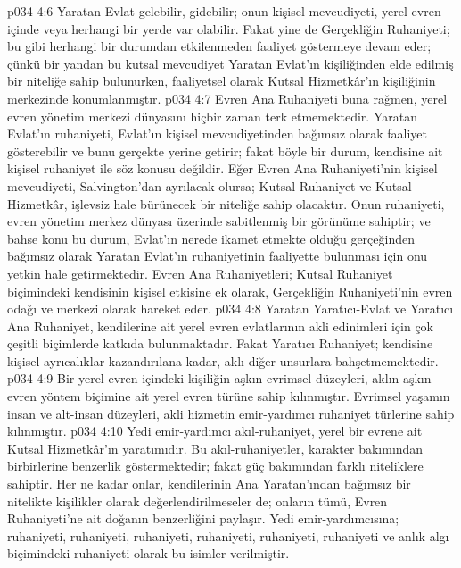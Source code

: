 \vs p034 4:6 Yaratan Evlat gelebilir, gidebilir; onun kişisel mevcudiyeti, yerel evren içinde veya herhangi bir yerde var olabilir. Fakat yine de Gerçekliğin Ruhaniyeti; bu gibi herhangi bir durumdan etkilenmeden faaliyet göstermeye devam eder; çünkü bir yandan bu kutsal mevcudiyet Yaratan Evlat’ın kişiliğinden elde edilmiş bir niteliğe sahip bulunurken, faaliyetsel olarak Kutsal Hizmetkâr’ın kişiliğinin merkezinde konumlanmıştır.
\vs p034 4:7 Evren Ana Ruhaniyeti buna rağmen, yerel evren yönetim merkezi dünyasını hiçbir zaman terk etmemektedir. Yaratan Evlat’ın ruhaniyeti, Evlat’ın kişisel mevcudiyetinden bağımsız olarak faaliyet gösterebilir ve bunu gerçekte yerine getirir; fakat böyle bir durum, kendisine ait kişisel ruhaniyet ile söz konusu değildir. Eğer Evren Ana Ruhaniyeti’nin kişisel mevcudiyeti, Salvington’dan ayrılacak olursa; Kutsal Ruhaniyet ve Kutsal Hizmetkâr, işlevsiz hale bürünecek bir niteliğe sahip olacaktır. Onun ruhaniyeti, evren yönetim merkez dünyası üzerinde sabitlenmiş bir görünüme sahiptir; ve bahse konu bu durum, Evlat’ın nerede ikamet etmekte olduğu gerçeğinden bağımsız olarak Yaratan Evlat’ın ruhaniyetinin faaliyette bulunması için onu yetkin hale getirmektedir. Evren Ana Ruhaniyetleri; Kutsal Ruhaniyet biçimindeki kendisinin kişisel etkisine ek olarak, Gerçekliğin Ruhaniyeti’nin evren odağı ve merkezi olarak hareket eder.
\vs p034 4:8 Yaratan Yaratıcı\hyp{}Evlat ve Yaratıcı Ana Ruhaniyet, kendilerine ait yerel evren evlatlarının akli edinimleri için çok çeşitli biçimlerde katkıda bulunmaktadır. Fakat Yaratıcı Ruhaniyet; kendisine kişisel ayrıcalıklar kazandırılana kadar, aklı diğer unsurlara bahşetmemektedir.
\vs p034 4:9 Bir yerel evren içindeki kişiliğin aşkın evrimsel düzeyleri, aklın aşkın evren yöntem biçimine ait yerel evren türüne sahip kılınmıştır. Evrimsel yaşamın insan ve alt\hyp{}insan düzeyleri, akli hizmetin emir\hyp{}yardımcı ruhaniyet türlerine sahip kılınmıştır.
\vs p034 4:10 Yedi emir\hyp{}yardımcı akıl\hyp{}ruhaniyet, yerel bir evrene ait Kutsal Hizmetkâr’ın yaratımıdır. Bu akıl\hyp{}ruhaniyetler, karakter bakımından birbirlerine benzerlik göstermektedir; fakat güç bakımından farklı niteliklere sahiptir. Her ne kadar onlar, kendilerinin Ana Yaratan’ından bağımsız bir nitelikte kişilikler olarak değerlendirilmeseler de; onların tümü, Evren Ruhaniyeti’ne ait doğanın benzerliğini paylaşır. Yedi emir\hyp{}yardımcısına;  ruhaniyeti,  ruhaniyeti,  ruhaniyeti,  ruhaniyeti,  ruhaniyeti,  ruhaniyeti ve anlık algı biçimindeki  ruhaniyeti olarak bu isimler verilmiştir.
